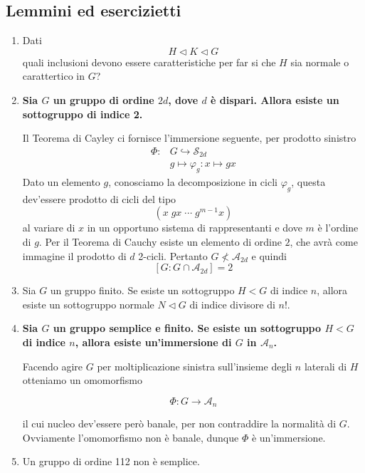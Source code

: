 \documentclass[a4paper]{article}
\theoremstyle{remark}
\theoremstyle{definition}
\renewcommand{\S}{\mathcal{S}}
\begin{document}
\subsection{Lemmini ed esercizietti}
\begin{multicols}{2}
	\begin{enumerate}
		\item Dati $$  H \lhd K \lhd G  $$ quali inclusioni devono essere caratteristiche per far si che $ H $ sia normale o carattertico in $ G $?
		
		\item \textbf{Sia $ G $ un gruppo di ordine $ 2d $, dove $ d $ è dispari. Allora esiste un sottogruppo di indice 2.}
		
		Il Teorema di Cayley ci fornisce l'immersione seguente, per prodotto sinistro
		\begin{align*}
		 \Phi \colon & G \hookrightarrow \S_{2d} \\
		 & g \mapsto \varphi_g \colon x \mapsto gx
		\end{align*}
		Dato un elemento $ g $, conosciamo la decomposizione in cicli $ \varphi_g $, questa dev'essere prodotto di cicli del tipo
		$$  (x \; gx \; \cdots \; g^{m-1}x)  $$
		al variare di $ x $ in un opportuno sistema di rappresentanti e dove $ m $ è l'ordine di $ g $. Per il Teorema di Cauchy esiste un elemento di ordine $ 2 $, che avrà come immagine il prodotto di $ d $ 2-cicli. Pertanto $ G \nless \mathcal{A}_{2d} $ e quindi $$  [G : G \cap \mathcal{A}_{2d}] = 2  $$
		
		\item Sia $ G $ un gruppo finito. Se esiste un sottogruppo $ H < G $ di indice $ n $, allora esiste un sottogruppo normale $ N \lhd G $ di indice divisore di $ n! $.
		
		\item \textbf{Sia $ G $ un gruppo semplice e finito. Se esiste un sottogruppo $ H < G $ di indice $ n $, allora esiste un'immersione di $ G $ in $ \mathcal{A}_n $.}
		
		Facendo agire $ G $ per moltiplicazione sinistra sull'insieme degli $ n $ laterali di $ H $ otteniamo un omomorfismo
		
		\[ \Phi \colon G \to \mathcal{A}_n \]
		
		il cui nucleo dev'essere però banale, per non contraddire la normalità di $ G $. Ovviamente l'omomorfismo non è banale, dunque $ \Phi $ è un'immersione.
		
		\item Un gruppo di ordine 112 non è semplice.
		

\end{enumerate}
\end{multicols}
\end{document}
